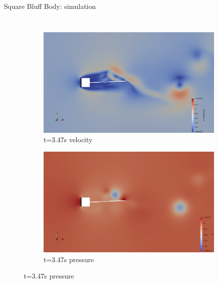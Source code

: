 \documentclass[10pt,t]{beamer}
\begin{document}
\begin{frame}{Square Bluff Body: simulation}
\begin{columns}
\begin{figure}[t]
\medskip
\begin{subfigure}{0.5\textwidth}
  \includegraphics[width=\linewidth]{images/sq-cyl/sq_v2.png}
  \caption{t=3.47s velocity}
  \label{fig:sq_v2}
\end{subfigure}\hfil %
\begin{subfigure}{0.5\textwidth}
  \includegraphics[width=\linewidth]{images/sq-cyl/sq_p2.png}
  \caption{t=3.47s pressure}
  \label{fig:sq_p2}
\end{subfigure}\hfil %


\end{figure}
\end{columns}
\end{frame}
\end{document}
